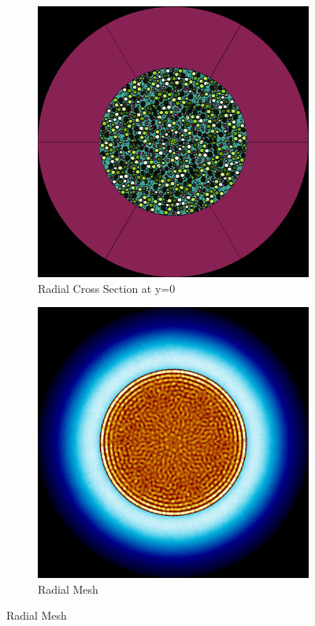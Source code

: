 \begin{figure}[H]
\centering

\begin{subfigure}{0.45\textwidth}
  \includegraphics[width=0.95\linewidth]{figures/180-240/180-240-r}
  \caption{Radial Cross Section at y=0}
  \label{fig:180-240-r}
\end{subfigure}%
%
\begin{subfigure}{0.45\textwidth}
  \includegraphics[width=0.95\linewidth]{figures/180-240/180-240-rm}
  \caption{Radial Mesh}
  \label{fig:180-240-rm}
\end{subfigure}


\end{figure}
